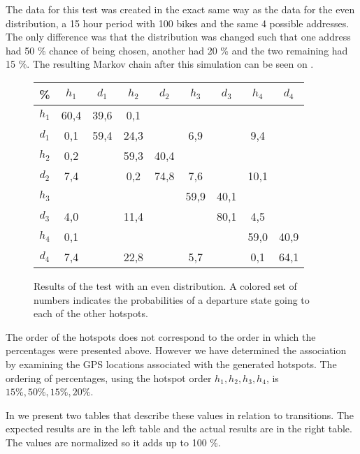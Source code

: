 The data for this test was created in the exact same way as the data for the even distribution, a 15 hour period with 100 bikes and the same 4 possible addresses.
The only difference was that the distribution was changed such that one address had 50 \% chance of being chosen, another had 20 \% and the two remaining had 15 \%.
The resulting Markov chain after this simulation can be seen on .

\begin{figure}[p]
	\centering
	\begin{tabular}{|c | c c c c c c c c|}
		\hline
		\% &      $ h_1 $ & $ d_1 $ & $ h_2 $ & $ d_2 $ & $ h_3 $ & $ d_3 $ & $ h_4 $ & $ d_4 $\\
		\hline
		$ h_1 $ & 60,4 &  39,6 &   0,1 &   &   &   &   &  \\
		$ d_1 $ & 0,1 &  59,4 &  {\color{red}24,3} &   &   {\color{red}6,9} &   &   {\color{red}9,4} &  \\
		$ h_2 $ & 0,2 &   &  59,3 &  40,4 &   &   &   &  \\
		$ d_2 $ & {\color{blue}7,4} &   &   0,2 &  74,8 &   {\color{blue}7,6} &   &  {\color{blue}10,1} &  \\
		$ h_3 $ & &   &   &   &  59,9 &  40,1 &   &  \\
		$ d_3 $ & {\color{orange}4,0} &   &  {\color{orange}11,4} &   &   &  80,1 &   {\color{orange}4,5} &  \\
		$ h_4 $ & 0,1 &   &   &   &   &   &  59,0 &  40,9\\
		$ d_4 $ & {\color{purple}7,4} &   &  {\color{purple}22,8} &   &   {\color{purple}5,7} &   &   0,1 &  64,1\\
		\hline
	\end{tabular}
	\caption{Results of the test with an even distribution. A colored set of numbers indicates the probabilities of a departure state going to each of the other hotspots.}\label{test_uneven}
\end{figure}

The order of the hotspots does not correspond to the order in which the percentages were presented above.
However we have determined the association by examining the GPS locations associated with the generated hotspots.
The ordering of percentages, using the hotspot order $h_1, h_2, h_3, h_4$, is $15\%, 50\%, 15\%, 20\%$.

In  we present two tables that describe these values in relation to transitions.
The expected results are in the left table and the actual results are in the right table.
The values are normalized so it adds up to 100 \%.

